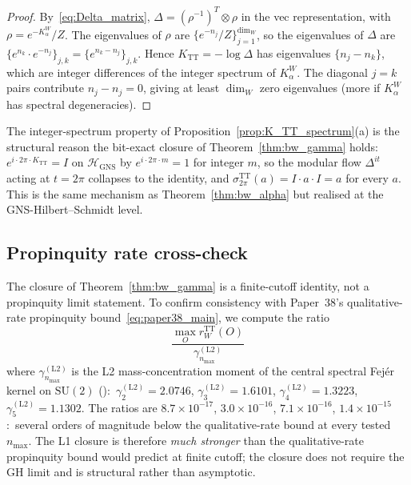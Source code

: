 \documentclass[11pt,a4paper]{article}
\theoremstyle{plain}
\theoremstyle{definition}
\newcommand{\nmax}{n_{\max}}
\newcommand{\Hilb}{\mathcal{H}}
\newcommand{\SU}{\mathrm{SU}}
\newcommand{\TT}{\mathrm{TT}}
\newcommand{\GNS}{\mathrm{GNS}}
\begin{document}
\begin{proof}
By~\eqref{eq:Delta_matrix}, $\Delta = (\rho^{-1})^T \otimes \rho$ in
the vec representation, with $\rho = e^{-K_\alpha^W}/Z$. The
eigenvalues of $\rho$ are $\{e^{-n_j}/Z\}_{j = 1}^{\dim_W}$, so the
eigenvalues of $\Delta$ are $\{e^{n_k} \cdot e^{-n_j}\}_{j, k} =
\{e^{n_k - n_j}\}_{j, k}$. Hence $K_{\TT} = -\log \Delta$ has
eigenvalues $\{n_j - n_k\}$, which are integer differences of the
integer spectrum of $K_\alpha^W$. The diagonal $j = k$ pairs contribute
$n_j - n_j = 0$, giving at least $\dim_W$ zero eigenvalues (more if
$K_\alpha^W$ has spectral degeneracies).
\end{proof}

The integer-spectrum property
of Proposition~\ref{prop:K_TT_spectrum}(a) is the structural reason
the bit-exact closure of Theorem~\ref{thm:bw_gamma} holds:\
$e^{i \cdot 2\pi \cdot K_{\TT}} = I$ on $\Hilb_{\GNS}$ by
$e^{i \cdot 2\pi \cdot m} = 1$ for integer $m$, so the modular flow
$\Delta^{it}$ acting at $t = 2\pi$ collapses to the identity, and
$\sigma_{2\pi}^{\TT}(a) = I \cdot a \cdot I = a$ for every $a$. This is
the same mechanism as Theorem~\ref{thm:bw_alpha} but realised at the
GNS-Hilbert--Schmidt level.

\subsection{Propinquity rate cross-check}\label{sec:propinquity_consistency}

The closure of Theorem~\ref{thm:bw_gamma} is a finite-cutoff identity,
not a propinquity limit statement. To confirm consistency with
Paper~38's qualitative-rate propinquity bound~\eqref{eq:paper38_main},
we compute the ratio
\begin{equation*}
   \frac{\max_O r_W^{\TT}(O)}{\gamma_{\nmax}^{(\mathrm{L2})}}
\end{equation*}
where $\gamma_{\nmax}^{(\mathrm{L2})}$ is the L2 mass-concentration
moment of the central spectral Fej\'er kernel on $\SU(2)$
(\cite[Lemma~L2]{paper38}):\
$\gamma_2^{(\mathrm{L2})} = 2.0746$, $\gamma_3^{(\mathrm{L2})} = 1.6101$,
$\gamma_4^{(\mathrm{L2})} = 1.3223$, $\gamma_5^{(\mathrm{L2})} = 1.1302$.
The ratios are $8.7 \times 10^{-17}$, $3.0 \times 10^{-16}$,
$7.1 \times 10^{-16}$, $1.4 \times 10^{-15}$:\ several orders of
magnitude below the qualitative-rate bound at every tested $\nmax$.
The L1 closure is therefore \emph{much stronger} than the qualitative-rate
propinquity bound would predict at finite cutoff; the closure does not
require the GH limit and is structural rather than asymptotic.
\end{document}
